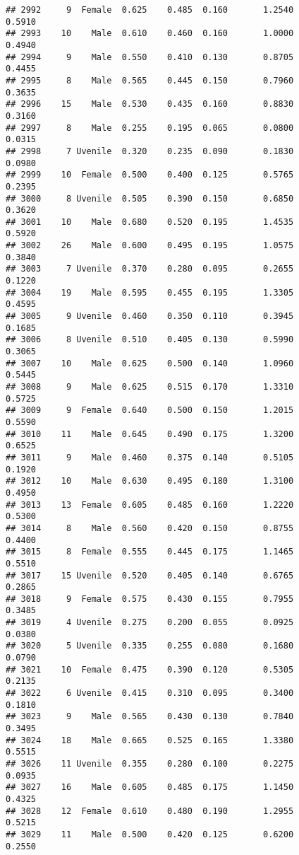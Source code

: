 \documentclass[
]{article}
\begin{document}
\begin{verbatim}
## 2992     9  Female  0.625    0.485  0.160       1.2540         0.5910
## 2993    10    Male  0.610    0.460  0.160       1.0000         0.4940
## 2994     9    Male  0.550    0.410  0.130       0.8705         0.4455
## 2995     8    Male  0.565    0.445  0.150       0.7960         0.3635
## 2996    15    Male  0.530    0.435  0.160       0.8830         0.3160
## 2997     8    Male  0.255    0.195  0.065       0.0800         0.0315
## 2998     7 Uvenile  0.320    0.235  0.090       0.1830         0.0980
## 2999    10  Female  0.500    0.400  0.125       0.5765         0.2395
## 3000     8 Uvenile  0.505    0.390  0.150       0.6850         0.3620
## 3001    10    Male  0.680    0.520  0.195       1.4535         0.5920
## 3002    26    Male  0.600    0.495  0.195       1.0575         0.3840
## 3003     7 Uvenile  0.370    0.280  0.095       0.2655         0.1220
## 3004    19    Male  0.595    0.455  0.195       1.3305         0.4595
## 3005     9 Uvenile  0.460    0.350  0.110       0.3945         0.1685
## 3006     8 Uvenile  0.510    0.405  0.130       0.5990         0.3065
## 3007    10    Male  0.625    0.500  0.140       1.0960         0.5445
## 3008     9    Male  0.625    0.515  0.170       1.3310         0.5725
## 3009     9  Female  0.640    0.500  0.150       1.2015         0.5590
## 3010    11    Male  0.645    0.490  0.175       1.3200         0.6525
## 3011     9    Male  0.460    0.375  0.140       0.5105         0.1920
## 3012    10    Male  0.630    0.495  0.180       1.3100         0.4950
## 3013    13  Female  0.605    0.485  0.160       1.2220         0.5300
## 3014     8    Male  0.560    0.420  0.150       0.8755         0.4400
## 3015     8  Female  0.555    0.445  0.175       1.1465         0.5510
## 3017    15 Uvenile  0.520    0.405  0.140       0.6765         0.2865
## 3018     9  Female  0.575    0.430  0.155       0.7955         0.3485
## 3019     4 Uvenile  0.275    0.200  0.055       0.0925         0.0380
## 3020     5 Uvenile  0.335    0.255  0.080       0.1680         0.0790
## 3021    10  Female  0.475    0.390  0.120       0.5305         0.2135
## 3022     6 Uvenile  0.415    0.310  0.095       0.3400         0.1810
## 3023     9    Male  0.565    0.430  0.130       0.7840         0.3495
## 3024    18    Male  0.665    0.525  0.165       1.3380         0.5515
## 3026    11 Uvenile  0.355    0.280  0.100       0.2275         0.0935
## 3027    16    Male  0.605    0.485  0.175       1.1450         0.4325
## 3028    12  Female  0.610    0.480  0.190       1.2955         0.5215
## 3029    11    Male  0.500    0.420  0.125       0.6200         0.2550

\end{verbatim}
\end{document}
